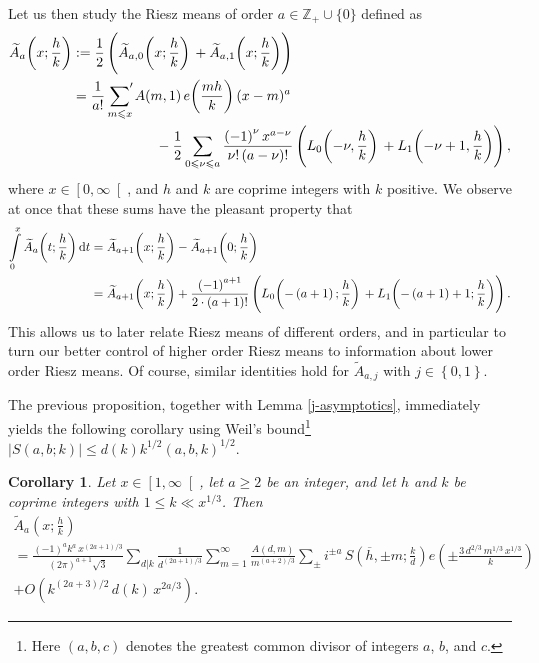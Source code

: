\documentclass[a4paper,10pt,twoside]{amsart}
\newtheorem{corollary}[theorem]{Corollary}
\theoremstyle{definition}
\numberwithin{equation}{section}
\renewcommand\:{\colon}
\newcommand{\sump}{\mathop{{\sum}^{\raisebox{-3pt}{\makebox[0pt][l]{$'$}}}}}
\begin{document}
\noindent Let us then study the Riesz means of order $a\in\mathbb Z_+\cup\{0\}$ defined as
\begin{align}\label{main-term}
\widetilde A_a\!\left(x;\frac hk\right)&:=\frac12\left(\widetilde A_{a,0}\!\left(x;\frac hk\right)\vphantom{\Bigg|}+\widetilde A_{a,1}\!\left(x;\frac hk\right)\right) \nonumber \\
&=\frac1{a!}\sump_{m\leqslant x}A(m,1)\,e\!\left(\frac{mh}k\right)(x-m)^a \nonumber \\
&\qquad\qquad\qquad-\frac12\sum_{0\leqslant\nu\leqslant a}\frac{\left(-1\right)^\nu x^{a-\nu}}{\nu!\left(a-\nu\right)!}\left(L_0\!\left(-\nu,\frac hk\right)\vphantom{\Bigg|}+L_1\!\left(-\nu+1,\frac hk\right)\right),
\end{align}
where $x\in\left[0,\infty\right[$, and $h$ and $k$ are coprime integers with $k$ positive.
We observe at once that these sums have the pleasant property that
\begin{align*}
\int\limits_0^x\widetilde A_a\!\left(t;\frac hk\right)\mathrm dt
&=\widetilde A_{a+1}\!\left(x;\frac hk\right)-\widetilde A_{a+1}\!\left(0;\frac hk\right)\\
&=\widetilde A_{a+1}\!\left(x;\frac hk\right)+\frac{\left(-1\right)^{a+1}}{2\cdot\left(a+1\right)!}\left(L_0\!\left(-\left(a+1\right);\frac hk\right)\vphantom{\Bigg|}+L_1\!\left(-\left(a+1\right)+1;\frac hk\right)\right).
\end{align*}
This allows us to later relate Riesz means of different orders, and in particular to turn our better control of higher order Riesz means to information about lower order Riesz means. Of course, similar identities hold for $\widetilde A_{a,j}$ with $j\in\left\{0,1\right\}$.

The previous proposition, together with Lemma \ref{j-asymptotics}, immediately yields the following corollary using Weil's bound\footnote{Here $(a,b,c)$ denotes the greatest common divisor of integers $a$, $b$, and $c$.} $|S(a,b;k)|\leq d(k)k^{1/2}(a,b,k)^{1/2}$.
\begin{corollary}\label{approximate-voronoi-for-large-a}
Let $x\in\left[1,\infty\right[$, let $a\geqslant 2$ be an integer, and let $h$ and $k$ be coprime integers with $1\leqslant k\ll x^{1/3}$. Then 
\begin{multline*}
\widetilde A_a\!\left(x;\frac hk\right)\\
=\frac{\left(-1\right)^ak^a\,x^{(2a+1)/3}}{(2\pi)^{a+1}\sqrt3}\sum_{d|k}\frac1{d^{(2a+1)/3}}\sum_{m=1}^\infty\frac{A(d,m)}{m^{(a+2)/3}}\sum_\pm i^{\pm a}\,S\!\left(\overline h,\pm m;\frac kd\right)e\!\left(\pm\frac{3\,d^{2/3}\,m^{1/3}\,x^{1/3}}{k}\right)\\
+O\left(k^{(2a+3)/2}\,d(k)\,x^{2a/3}\right).
\end{multline*}
\end{corollary}
\end{document}
